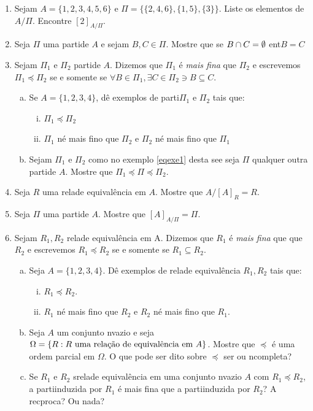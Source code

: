 \begin{enumerate}[{\bf 1.}]

\item Sejam $A=\{1,2,3,4,5,6\}$ e $\Pi=\{\{2,4,6\},\{1,5\},\{3\}\}$. Liste os elementos de $A/\Pi$. Encontre $[2]_{A/\Pi}$. 

\item Seja $\Pi$ uma parti\cao de $A$ e sejam $B,C\in\Pi$. Mostre que se $B\cap C=\emptyset$ ent\ao $B=C$

\item\label{eqrexcerc3} Sejam $\Pi_1$ e $\Pi_2$ parti\coes de $A$. Dizemos que $\Pi_1$ \'e {\it mais fina} que $\Pi_2$ e escrevemos $\Pi_1\preceq\Pi_2$ se e somente se $\forall B\in \Pi_1, \exists C\in \Pi_2 \ni B\subseteq C$.
\begin{enumerate}[a)]
\item Se $A=\{1,2,3,4\}$, d\^e exemplos de parti\coes $\Pi_1$ e $\Pi_2$ tais que:
\begin{enumerate}[i.]
\item $\Pi_1\preceq\Pi_2$
\item $\Pi_1$ n\ao \'e mais fino que $\Pi_2$ e $\Pi_2$ n\ao \'e mais fino que $\Pi_1$
\end{enumerate}
\item Sejam $\Pi_1$ e $\Pi_2$ como no exemplo \ref{eqexe1} desta se\cao e seja $\Pi$ qualquer outra parti\cao de $A$. Mostre que $\Pi_1\preceq\Pi\preceq\Pi_2$.
\end{enumerate}

\item Seja $R$ uma rela\cao de equival\^encia em $A$. Mostre que $A/[A]_R=R$.

\item Seja $\Pi$ uma parti\cao de $A$. Mostre que $[A]_{A/\Pi}=\Pi$.

\item Sejam $R_1,R_2$ rela\coes de equival\^encia em A. Dizemos que $R_1$ \'e {\it mais fina} que que $R_2$ e escrevemos $R_1\preceq R_2$ se e somente se $R_1\subseteq R_2$.
\begin{enumerate}[a)]
\item Seja $A=\{1,2,3,4\}$. D\^e exemplos de rela\coes de equival\^encia $R_1,R_2$ tais que:
\begin{enumerate}[i)]
\item $R_1\preceq R_2$.
\item $R_1$ n\ao \'e mais fino que $R_2$ e $R_2$ n\ao \'e mais fino que $R_1$. 
\end{enumerate}
\item Seja $A$ um conjunto n\ao vazio e seja $\Omega=\{R: R \textrm{ uma rela\cao de equival\^encia em $A$}\}$. Mostre que $\preceq$ \'e uma ordem parcial em $\Omega$. O que pode ser dito sobre $\preceq$ ser ou n\ao completa?
\item Se $R_1$ e $R_2$ s\ao rela\coes de equival\^encia em uma conjunto n\ao vazio $A$ com $R_1\preceq R_2$, a parti\cao induzida por $R_1$ \'e mais fina que a parti\cao induzida por $R_2$? A rec\ih proca? Ou nada?
\end{enumerate}


\end{enumerate}
